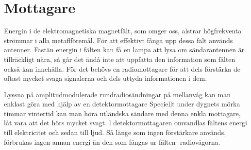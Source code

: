 \section{Mottagare}

Energin i de elektromagnetiska magnetfält, som omger oss, alstrar
högfrekventa strömmar i alla metaflföremål. För att effektivt fånga
upp dessa fält används antenner.  Fastän energin i fälten kan få en
lampa att lysa om sändarantennen är tillräckligt nära, så går det ändå
inte att uppfatta den information som fälten också kan innehålla.  För
det behövs en radiomottagare för att dels förstärka de oftast mycket
svaga signalerna och dels uttyda informationen i dem.

Lyssna på amplitudmodulerade rundradiosändningar på mellanvåg kan man
enklast göra med hjälp av en detektormottagare Speciellt under dygnets
mörka timmar vintertid kan man höra utländska sändare med denna enkla
mottagare, låt vara att det hörs mycket svagt. l detektormottagaren
omvandlas fältens energi till elektricitet och sedan till ljud. Så
länge som ingen förstärkare används, förbrukas ingen annan energi än
den som fångas ur fälten -radiovågorna.
